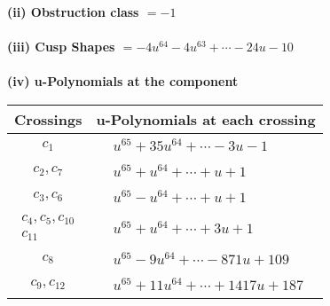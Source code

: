\documentclass[1p]{elsarticle_modified}
\theoremstyle{definition}
\begin{document}
\flushleft \textbf{(ii) Obstruction class $= -1$}\\~\\
\flushleft \textbf{(iii) Cusp Shapes $= -4 u^{64}-4 u^{63}+\cdots-24 u-10$}\\~\\
\newpage\renewcommand{\arraystretch}{1}
\flushleft \textbf{(iv) u-Polynomials at the component}\newline \\
\begin{tabular}{m{50pt}|m{274pt}}
Crossings & \hspace{64pt}u-Polynomials at each crossing \\
\hline $$\begin{aligned}c_{1}\end{aligned}$$&$\begin{aligned}
&u^{65}+35 u^{64}+\cdots-3 u-1
\end{aligned}$\\
\hline $$\begin{aligned}c_{2},c_{7}\end{aligned}$$&$\begin{aligned}
&u^{65}+u^{64}+\cdots+u+1
\end{aligned}$\\
\hline $$\begin{aligned}c_{3},c_{6}\end{aligned}$$&$\begin{aligned}
&u^{65}- u^{64}+\cdots+u+1
\end{aligned}$\\
\hline $$\begin{aligned}c_{4},c_{5},c_{10}\\c_{11}\end{aligned}$$&$\begin{aligned}
&u^{65}+u^{64}+\cdots+3 u+1
\end{aligned}$\\
\hline $$\begin{aligned}c_{8}\end{aligned}$$&$\begin{aligned}
&u^{65}-9 u^{64}+\cdots-871 u+109
\end{aligned}$\\
\hline $$\begin{aligned}c_{9},c_{12}\end{aligned}$$&$\begin{aligned}
&u^{65}+11 u^{64}+\cdots+1417 u+187
\end{aligned}$\\
\hline
\end{tabular}\\~\\
\end{document}
